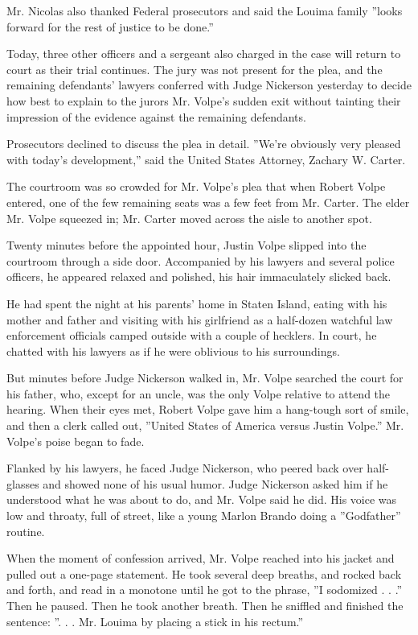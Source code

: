 Mr. Nicolas also thanked Federal prosecutors and said the Louima family
''looks forward for the rest of justice to be done.''

Today, three other officers and a sergeant also charged in the case will
return to court as their trial continues. The jury was not present for
the plea, and the remaining defendants' lawyers conferred with Judge
Nickerson yesterday to decide how best to explain to the jurors Mr.
Volpe's sudden exit without tainting their impression of the evidence
against the remaining defendants.

Prosecutors declined to discuss the plea in detail. ''We're obviously
very pleased with today's development,'' said the United States
Attorney, Zachary W. Carter.

The courtroom was so crowded for Mr. Volpe's plea that when Robert Volpe
entered, one of the few remaining seats was a few feet from Mr. Carter.
The elder Mr. Volpe squeezed in; Mr. Carter moved across the aisle to
another spot.

Twenty minutes before the appointed hour, Justin Volpe slipped into the
courtroom through a side door. Accompanied by his lawyers and several
police officers, he appeared relaxed and polished, his hair immaculately
slicked back.

He had spent the night at his parents' home in Staten Island, eating
with his mother and father and visiting with his girlfriend as a
half-dozen watchful law enforcement officials camped outside with a
couple of hecklers. In court, he chatted with his lawyers as if he were
oblivious to his surroundings.

But minutes before Judge Nickerson walked in, Mr. Volpe searched the
court for his father, who, except for an uncle, was the only Volpe
relative to attend the hearing. When their eyes met, Robert Volpe gave
him a hang-tough sort of smile, and then a clerk called out, ''United
States of America versus Justin Volpe.'' Mr. Volpe's poise began to
fade.

Flanked by his lawyers, he faced Judge Nickerson, who peered back over
half-glasses and showed none of his usual humor. Judge Nickerson asked
him if he understood what he was about to do, and Mr. Volpe said he did.
His voice was low and throaty, full of street, like a young Marlon
Brando doing a ''Godfather'' routine.

When the moment of confession arrived, Mr. Volpe reached into his jacket
and pulled out a one-page statement. He took several deep breaths, and
rocked back and forth, and read in a monotone until he got to the
phrase, ''I sodomized . . .'' Then he paused. Then he took another
breath. Then he sniffled and finished the sentence: ''. . . Mr. Louima
by placing a stick in his rectum.''


